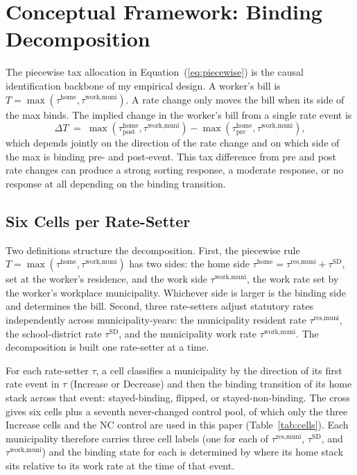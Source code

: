 \documentclass[12pt]{article}
\begin{document}
\section{Conceptual Framework: Binding Decomposition}
\label{sec:theory}

The piecewise tax allocation in Equation~(\ref{eq:piecewise}) is the causal
identification backbone of my empirical design. A worker's bill is
$T = \max(\tau^{\text{home}}, \tau^{\text{work,muni}})$. A rate change
only moves the bill when its side of the max binds. The
implied change in the worker's bill from a single rate event is
\[
  \Delta T \;=\; \max(\tau^{\text{home}}_{\text{post}}, \tau^{\text{work,muni}})
              - \max(\tau^{\text{home}}_{\text{pre}},  \tau^{\text{work,muni}}),
\]
which depends jointly on the direction of the rate change and on
which side of the max is binding pre- and post-event. This tax difference from pre and post rate changes can
produce a strong sorting response, a moderate response, or no
response at all depending on the binding transition.

\subsection{Six Cells per Rate-Setter}
\label{subsec:cells}

Two definitions structure the decomposition. First, the piecewise
rule $T = \max(\tau^{\text{home}}, \tau^{\text{work,muni}})$ has two
sides: the home side
$\tau^{\text{home}} = \tau^{\text{res,muni}} + \tau^{\text{SD}}$,
set at the worker's residence, and the work side
$\tau^{\text{work,muni}}$, the work rate set by the worker's workplace municipality.
Whichever side is larger is the binding side and determines
the bill. Second, three rate-setters adjust statutory rates
independently across municipality-years: the municipality resident
rate $\tau^{\text{res,muni}}$, the school-district rate
$\tau^{\text{SD}}$, and the municipality work rate
$\tau^{\text{work,muni}}$. The decomposition is built one rate-setter
at a time.

For each rate-setter $\tau$, a cell classifies a municipality
by the direction of its first rate event in $\tau$ (Increase or
Decrease) and then the binding transition of its home stack
across that event: stayed-binding, flipped, or stayed-non-binding.
The cross gives six cells plus a seventh never-changed control pool,
of which only the three Increase cells and the NC control are used in
this paper (Table~\ref{tab:cells}). Each municipality therefore carries three
cell labels (one for each of $\tau^{\text{res,muni}}$,
$\tau^{\text{SD}}$, and $\tau^{\text{work,muni}}$) and the binding
state for each is determined by where its home stack sits relative
to its work rate at the time of that event.
\end{document}

